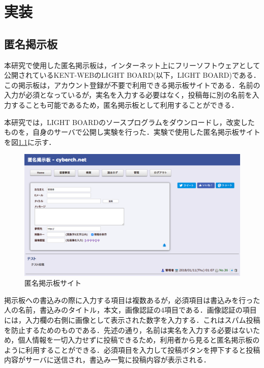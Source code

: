 \documentclass[10pt, a4paper]{jreport}
\begin{document}
\chapter{実装}
\section{匿名掲示板}\label{sec: bbs}
本研究で使用した匿名掲示板は，インターネット上にフリーソフトウェアとして公開されているKENT-WEBのLIGHT BOARD(以下，LIGHT BOARD)である\cite{kent_web_bbs}．この掲示板は，アカウント登録が不要で利用できる掲示板サイトである．名前の入力が必須となっているが，実名を入力する必要はなく，投稿毎に別の名前を入力することも可能であるため，匿名掲示板として利用することができる．

本研究では，LIGHT BOARDのソースプログラムをダウンロードし，改変したものを，自身のサーバで公開し実験を行った．実験で使用した匿名掲示板サイトを図\ref{fig: bbs_screenshot}に示す．

\begin{figure}[H]
	\begin{center}
		\includegraphics[width=130mm]{figures/bbs_screenshot.png}
	\end{center}
	\caption{匿名掲示板サイト}
	\label{fig: bbs_screenshot}
\end{figure}

掲示板への書込みの際に入力する項目は複数あるが，必須項目は書込みを行った人の名前，書込みのタイトル，本文，画像認証の4項目である．画像認証の項目には，入力欄の右側に画像として表示された数字を入力する．これはスパム投稿を防止するためのものである．先述の通り，名前は実名を入力する必要はないため，個人情報を一切入力せずに投稿できるため，利用者から見ると匿名掲示板のように利用することができる．必須項目を入力して投稿ボタンを押下すると投稿内容がサーバに送信され，書込み一覧に投稿内容が表示される．
\end{document}
